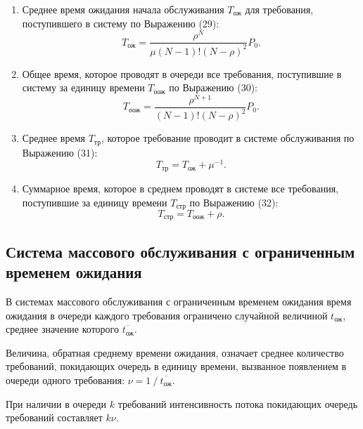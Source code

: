 \documentclass[14pt]{extarticle}
\begin{document}
\begin{enumerate}
        \item Среднее время ожидания начала обслуживания $T_\text{ож}$ для требования, поступившего в систему по Выражению (29):
        \begin{equation}
            T_\text{ож} = \frac{\rho^N}{\mu (N - 1)!(N - \rho)^2} P_0.
        \end{equation}

        \item Общее время, которое проводят в очереди все требования, поступившие в систему за единицу времени $T_\text{оож}$ по Выражению (30):
        \begin{equation}
            T_\text{оож} = \frac{\rho^{N + 1}}{(N - 1)!(N - \rho)^2} P_0.
        \end{equation}

        \item Среднее время $T_\text{тр}$, которое требование проводит в системе обслуживания  по Выражению (31):
        \begin{equation}
            T_\text{тр} = T_\text{ож} + \mu^{-1}.
        \end{equation}

        \item Суммарное время, которое в среднем проводят в системе все требования, поступившие за единицу времени $T_\text{стр}$  по Выражению (32):
        \begin{equation}
            T_\text{стр} = T_\text{оож} + \rho.
        \end{equation}
    \end{enumerate}

    \subsection{Система массового обслуживания с ограниченным временем ожидания}

    В системах массового обслуживания с ограниченным временем ожидания время ожидания в очереди каждого требования ограничено случайной величиной $ t_\text{ож} $, среднее значение которого $ \overline{t_\text{ож}} $.

    Величина, обратная среднему времени ожидания, означает среднее количество требований, покидающих очередь в единицу времени, вызванное появлением в очереди одного требования: $ \nu = 1\ /\  \overline{t_\text{ож}} $.

    При наличии в очереди $k$ требований интенсивность потока покидающих очередь требований составляет $ k \nu $.
\end{document}
